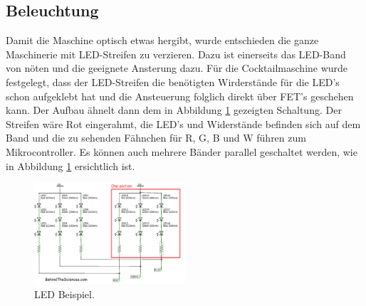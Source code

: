 \subsection{Beleuchtung}
\label{subsec:Beleuchtung}

Damit die Maschine optisch etwas hergibt, wurde entschieden die ganze Maschinerie mit LED-Streifen zu verzieren. Dazu ist einerseits das LED-Band von nöten und die geeignete Ansterung dazu. Für die Cocktailmaschine wurde festgelegt, dass der LED-Streifen die benötigten Wirderstände für die LED's schon aufgeklebt hat und die Ansteuerung folglich direkt über FET's geschehen kann. Der Aufbau ähnelt dann dem in Abbildung \ref{fig:LED1} gezeigten Schaltung. Der Streifen wäre Rot eingerahmt, die LED's und Widerstände befinden sich auf dem Band und die zu sehenden Fähnchen für R, G, B und W führen zum Mikrocontroller. Es können auch mehrere Bänder parallel geschaltet werden, wie in Abbildung \ref{fig:LED1} ersichtlich ist.

\begin{figure}[h!]
\center
\includegraphics[width = 0.5\textwidth]{graphics/Schema_LED1}
\caption{LED Beispiel.}
\label{fig:LED1}
\end{figure}